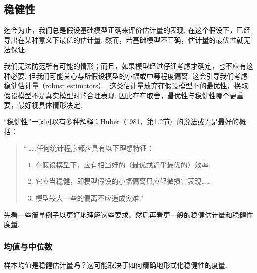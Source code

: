 \subsection{稳健性}\label{sec:10.2}
迄今为止，我们总是假设基础模型正确来评价估计量的表现. 在这个假设下，已经导出在某种意义下最优的估计量. 然而，若基础模型不正确，估计量的最优性就无法保证.

我们无法防范所有可能的情形；而且，如果模型经过仔细考虑才确定，也不应有这种必要. 但我们可能关心与所假设模型的小幅或中等程度偏离. 这会引导我们考虑稳健估计量（robust estimators）. 这类估计量放弃在假设模型下的最优性，换取假设模型不是真实模型时的合理表现. 因此存在取舍，最优性与稳健性哪个更重要，最好视具体情形决定.

“稳健性”一词可以有多种解释；\hyperref[bib:source171]{Huber（1981}，第1.2节）的说法或许是最好的概括：
\begin{quote}
“……任何统计程序都应具有以下理想特征：
\begin{enumerate}[label=(\arabic*)]
\item\label{item:10.2.huber.1} 在假设模型下，应有相当好的（最优或近乎最优的）效率.
\item\label{item:10.2.huber.2} 它应当稳健，即模型假设的小幅偏离只应轻微损害表现……
\item\label{item:10.2.huber.3} 模型较大一些的偏离不应造成灾难.”
\end{enumerate}
\end{quote}
先看一些简单例子以更好地理解这些要求，然后再看更一般的稳健估计量和稳健性度量.

\subsubsection{均值与中位数}\label{sec:10.2.1}
样本均值是稳健估计量吗？这可能取决于如何精确地形式化稳健性的度量.

